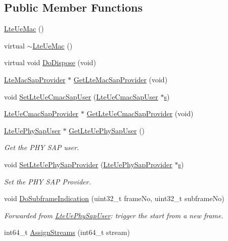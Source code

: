 \subsection*{Public Member Functions}
\begin{DoxyCompactItemize}
\item 
\hyperlink{classns3_1_1LteUeMac_af0687dd98f1c352b5f93f1c075377a16}{Lte\+Ue\+Mac} ()
\item 
virtual \hyperlink{classns3_1_1LteUeMac_abae5dc03ec6f51009834ba3755f3fc93}{$\sim$\+Lte\+Ue\+Mac} ()
\item 
virtual void \hyperlink{classns3_1_1LteUeMac_a9d346eeb8b11ca89525ac539035dd3a0}{Do\+Dispose} (void)
\item 
\hyperlink{classns3_1_1LteMacSapProvider}{Lte\+Mac\+Sap\+Provider} $\ast$ \hyperlink{classns3_1_1LteUeMac_a592632604e28463918836ef6fda0cc79}{Get\+Lte\+Mac\+Sap\+Provider} (void)
\item 
void \hyperlink{classns3_1_1LteUeMac_af1b56afd1b436e23efa6f9fbde167b99}{Set\+Lte\+Ue\+Cmac\+Sap\+User} (\hyperlink{classns3_1_1LteUeCmacSapUser}{Lte\+Ue\+Cmac\+Sap\+User} $\ast$\hyperlink{generate__test__data__lte__sinr_8m_ad83eeb3a142285d1243a08c6b7026df8}{s})
\item 
\hyperlink{classns3_1_1LteUeCmacSapProvider}{Lte\+Ue\+Cmac\+Sap\+Provider} $\ast$ \hyperlink{classns3_1_1LteUeMac_ae71a81a6a15a15b1f0f9a547e23edd2d}{Get\+Lte\+Ue\+Cmac\+Sap\+Provider} (void)
\item 
\hyperlink{classns3_1_1LteUePhySapUser}{Lte\+Ue\+Phy\+Sap\+User} $\ast$ \hyperlink{classns3_1_1LteUeMac_a6cba04b5ed547fb15cf1cbe772457ca9}{Get\+Lte\+Ue\+Phy\+Sap\+User} ()
\begin{DoxyCompactList}\small\item\em Get the P\+HY S\+AP user. \end{DoxyCompactList}\item 
void \hyperlink{classns3_1_1LteUeMac_a39b39a016515d37dc72b29e0fb9ef9d8}{Set\+Lte\+Ue\+Phy\+Sap\+Provider} (\hyperlink{classns3_1_1LteUePhySapProvider}{Lte\+Ue\+Phy\+Sap\+Provider} $\ast$\hyperlink{generate__test__data__lte__sinr_8m_ad83eeb3a142285d1243a08c6b7026df8}{s})
\begin{DoxyCompactList}\small\item\em Set the P\+HY S\+AP Provider. \end{DoxyCompactList}\item 
void \hyperlink{classns3_1_1LteUeMac_a1dee6aa86c7d323a4db1b76bdb94c0b6}{Do\+Subframe\+Indication} (uint32\+\_\+t frame\+No, uint32\+\_\+t subframe\+No)
\begin{DoxyCompactList}\small\item\em Forwarded from \hyperlink{classns3_1_1LteUePhySapUser}{Lte\+Ue\+Phy\+Sap\+User}\+: trigger the start from a new frame. \end{DoxyCompactList}\item 
int64\+\_\+t \hyperlink{classns3_1_1LteUeMac_a6335b528d71e2d8e1f24d09631c671b7}{Assign\+Streams} (int64\+\_\+t stream)
\end{DoxyCompactItemize}
